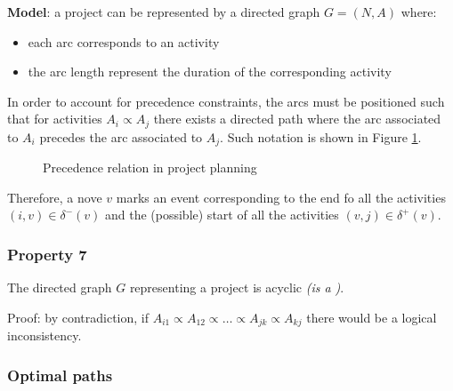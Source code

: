 \documentclass[english]{article}
\begin{document}
\textbf{Model}:
a project can be represented by a directed graph \(G = (N, A)\) where:

\begin{itemize}
  \item each arc corresponds to an activity
  \item the arc length represent the duration of the corresponding activity
\end{itemize}

In order to account for precedence constraints, the arcs must be positioned such that for activities \(A_i \propto A_j\) there exists a directed path where the arc associated to \(A_i\) precedes the arc associated to \(A_j\).
Such notation is shown in Figure \ref{fig:precedence-relation-in-project-planning}.

\begin{figure}[htbp]
  \centering
  \bigskip
  \bigskip
  \caption{Precedence relation in project planning}
  \label{fig:precedence-relation-in-project-planning}
\end{figure}

Therefore, a nove \(v\) marks an event corresponding to the end fo all the activities \(\left( i, v \right) \in \delta^-(v)\) and the (possible) start of all the activities \(\left( v, j \right) \in \delta^+(v)\).

\subsubsection{Property 7}

The directed graph \(G\) representing a project is acyclic \textit{(is a \DAG)}.

Proof:
by contradiction, if \(A_{i1} \propto A_{12} \propto \ldots \propto A_{jk} \propto A_{kj}\) there would be a logical inconsistency.

\subsubsection{Optimal paths}
\end{document}
